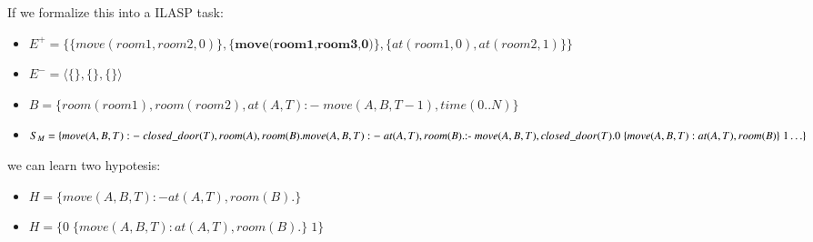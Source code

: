 If we formalize this into a ILASP task:
\begin{itemize}
    \item $E^+ = \{\{move(room1,room2,0)\},\{\textbf{move(room1,room3,0)}\}, \{at(room1,0),at(room2,1)\}\}$
    \item $E^- = \langle\{\},\{\},\{\}\rangle$
    \item $B = \{room(room1), room(room2), at(A,T) :-\; move(A,B,T-1), time(0..N)\}$
    \item $S_{M}=\{\\
                move(A,B,T) :-\; closed\_door(T), room(A), room(B). \\
                move(A,B,T) :-\; at(A,T), room(B).\\
                \text{:-}\; move(A,B,T), closed\_door(T).\\
                0\;\{move(A,B,T) : at(A,T), room(B)\}\;1\\
                \ldots\} \;$
\end{itemize}
we can learn two hypotesis:
\begin{itemize}
    \item $H = \{move(A,B,T) :- at(A,T), room(B).\}$
    \item $H = \{0\; \{move(A,B,T) : at(A,T), room(B).\}\; 1\}$
\end{itemize}

